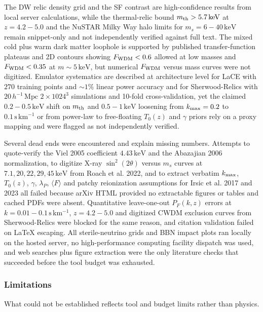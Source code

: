\documentclass[11pt,a4paper]{article}
\begin{document}
The DW relic density grid and the SF contrast are high-confidence results from local server calculations, while the thermal-relic bound $m_{\rm th} > 5.7\,\mathrm{keV}$ at $z = 4.2-5.0$ and the NuSTAR Milky Way halo limits for $m_s = 6-40\,\mathrm{keV}$ remain snippet-only and not independently verified against full text. The mixed cold plus warm dark matter loophole is supported by published transfer-function plateaus and 2D contours showing $F_{\rm WDM} < 0.6$ allowed at low masses and $F_{\rm WDM} < 0.35$ at $m \sim 5\,\mathrm{keV}$, but numerical $F_{\rm WDM}$ versus mass curves were not digitized. Emulator systematics are described at architecture level for LaCE with $270$ training points and $\sim 1\%$ linear power accuracy and for Sherwood-Relics with $20\,h^{-1}\,\mathrm{Mpc}$ $2\times1024^3$ simulations and 10-fold cross-validation, yet the claimed $0.2-0.5\,\mathrm{keV}$ shift on $m_{\rm th}$ and $0.5-1\,\mathrm{keV}$ loosening from $k_{\rm max} = 0.2$ to $0.1\,\mathrm{s\,km^{-1}}$ or from power-law to free-floating $T_0(z)$ and $\gamma$ priors rely on a proxy mapping and were flagged as not independently verified.

Several dead ends were encountered and explain missing numbers. Attempts to quote-verify the Viel 2005 coefficient $4.43\,\mathrm{keV}$ and the Abazajian 2006 normalization, to digitize X-ray $\sin^2(2\theta)$ versus $m_s$ curves at $7.1, 20, 22, 29, 45\,\mathrm{keV}$ from Roach et al. 2022, and to extract verbatim $k_{\rm max}$, $T_0(z)$, $\gamma$, $\lambda_P$, $\langle F \rangle$ and patchy reionization assumptions for Irsic et al. 2017 and 2023 all failed because arXiv HTML provided no extractable figures or tables and cached PDFs were absent. Quantitative leave-one-out $P_F(k,z)$ errors at $k = 0.01-0.1\,\mathrm{s\,km^{-1}}$, $z = 4.2-5.0$ and digitized CWDM exclusion curves from Sherwood-Relics were blocked for the same reason, and citation validation failed on LaTeX escaping. All sterile-neutrino grids and BBN impact plots ran locally on the hosted server, no high-performance computing facility dispatch was used, and web searches plus figure extraction were the only literature checks that succeeded before the tool budget was exhausted.

\subsubsection*{Limitations}
What could not be established reflects tool and budget limits rather than physics.
\end{document}
